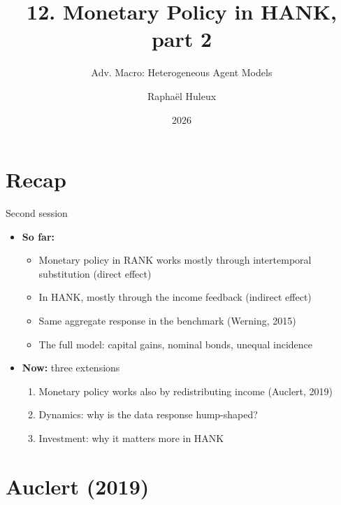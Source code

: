\documentclass[10pt,english]{beamer}
\begin{document}
\title{12. Monetary Policy in HANK, part 2\vspace{-2mm}}
\subtitle{Adv. Macro: Heterogeneous Agent Models}
\author{Raphaël Huleux}
\date{2026}

{
\begin{frame}

\maketitle

\end{frame}
}

\addtocounter{framenumber}{-1}

\section{Recap}

\begin{frame}{Second session}
\begin{itemize}
\item <+->\textbf{So far:}
\begin{itemize}
\item Monetary policy in RANK works mostly through intertemporal substitution (direct effect)
\item In HANK, mostly through the income feedback (indirect effect)
\item Same aggregate response in the benchmark (Werning, 2015)
\item The full model: capital gains, nominal bonds, unequal incidence
\end{itemize}
\item <+->\textbf{Now:} three extensions
\begin{enumerate}
\item Monetary policy works also by redistributing income (Auclert, 2019)
\item Dynamics: why is the data response hump-shaped?
\item Investment: why it matters more in HANK
\end{enumerate}
\end{itemize}
\end{frame}
%

\section{Auclert (2019)}
\end{document}
